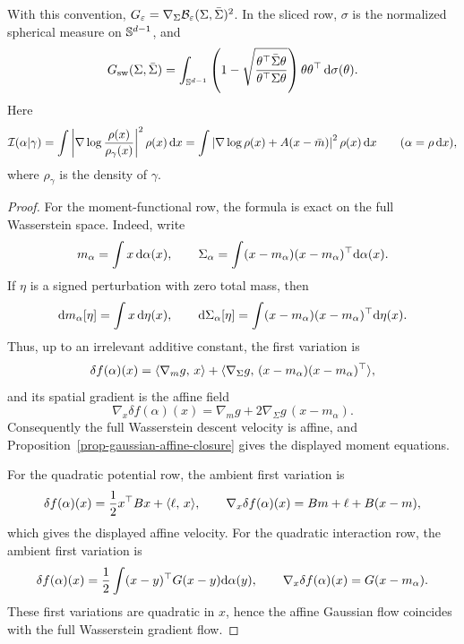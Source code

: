 \begin{prop}
\[	\]
	With this convention, \(G_\varepsilon=\nabla_\Sigma \mathcal{B}_\varepsilon(\Sigma,\bar\Sigma)^2\).
	In the sliced row, \(\sigma\) is the normalized spherical measure on \(\mathbb{S}^{d-1}\), and
	\[
		G_{\mathrm{sw}}(\Sigma,\bar\Sigma)
		=
		\int_{\mathbb{S}^{d-1}}
		\left(
			1-\sqrt{\frac{\theta^\top\bar\Sigma\theta}{\theta^\top\Sigma\theta}}
		\right)
		\theta\theta^\top\,\mathrm{d}\sigma(\theta).
	\]
	Here
	\[
		\mathcal I(\alpha|\gamma)
		=
		\int \left|\nabla\log\frac{\rho(x)}{\rho_\gamma(x)}\right|^2\rho(x)\,\mathrm{d} x
		=
		\int
		\left|\nabla\log\rho(x)+A(x-\bar m)\right|^2\rho(x)\,\mathrm{d} x
		\qquad(\alpha=\rho\,\mathrm{d} x),
	\]
	where $\rho_\gamma$ is the density of $\gamma$.
\end{prop}

\begin{proof}
	For the moment-functional row, the formula is exact on the full Wasserstein space. Indeed, write
	\[
		m_\alpha=\int x\,\mathrm{d}\alpha(x),
		\qquad
		\Sigma_\alpha=\int (x-m_\alpha)(x-m_\alpha)^\top\mathrm{d}\alpha(x).
	\]
	If \(\eta\) is a signed perturbation with zero total mass, then
	\[
		\mathrm{d} m_\alpha[\eta]=\int x\,\mathrm{d}\eta(x),
		\qquad
		\mathrm{d}\Sigma_\alpha[\eta]=\int (x-m_\alpha)(x-m_\alpha)^\top\mathrm{d}\eta(x).
	\]
	Thus, up to an irrelevant additive constant, the first variation is
	\[
		\delta f(\alpha)(x)
		=
		\langle \nabla_m g,\,x\rangle
		+
		\langle \nabla_\Sigma g,\,(x-m_\alpha)(x-m_\alpha)^\top\rangle,
	\]
	and its spatial gradient is the affine field
	\[
		\nabla_x\delta f(\alpha)(x)
		=
		\nabla_m g+2\nabla_\Sigma g\,(x-m_\alpha).
	\]
	Consequently the full Wasserstein descent velocity is affine, and Proposition~\ref{prop-gaussian-affine-closure} gives the displayed moment equations.

	For the quadratic potential row, the ambient first variation is
	\[
		\delta f(\alpha)(x)=\frac12x^\top Bx+\langle \ell,\,x\rangle,
		\qquad
		\nabla_x\delta f(\alpha)(x)=B m+\ell+B(x-m),
	\]
	which gives the displayed affine velocity. For the quadratic interaction row, the ambient first variation is
	\[
		\delta f(\alpha)(x)
		=
		\frac12\int (x-y)^\top G(x-y)\mathrm{d}\alpha(y),
		\qquad
		\nabla_x\delta f(\alpha)(x)=G(x-m_\alpha).
	\]
	These first variations are quadratic in \(x\), hence the affine Gaussian flow coincides with the full Wasserstein gradient flow.


\end{proof}
